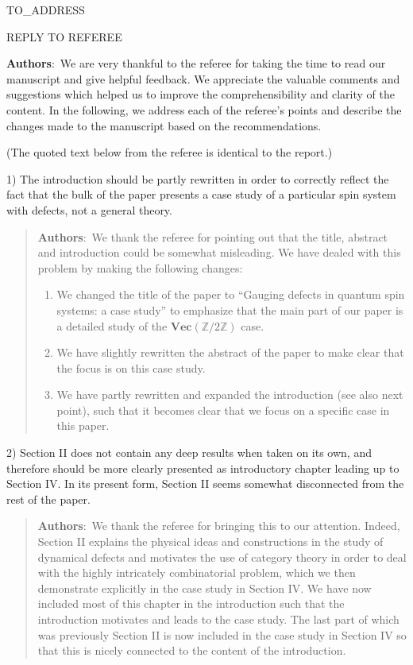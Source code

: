 \documentclass[a4paper,10pt]{letter}
\begin{document}
\begin{letter}{TO_ADDRESS}

	
\begin{center}
REPLY TO REFEREE
\end{center}

\textbf{Authors}:\ We are very thankful to the referee for taking the time to read our manuscript and give helpful feedback. We appreciate the valuable comments and suggestions which helped us to improve the comprehensibility and clarity of the content. In the following, we address each of the referee's points and describe the changes made to the manuscript based on the recommendations.

(The quoted text below from the referee is identical to the report.)
\vspace{0.5cm}

1) The introduction should be partly rewritten in order to correctly reflect the fact that the bulk of the paper presents a case study of a particular spin system with defects, not a general theory. 

\begin{quote}
	\textbf{Authors}:\ We thank the referee for pointing out that the title, abstract and introduction could be somewhat misleading. We have dealed with this problem by making the following changes:
		\begin{enumerate}
			\item We changed the title of the paper to ``Gauging defects in quantum spin systems: a case study'' to emphasize that the main part of our paper is a detailed study of the $\mathbf{Vec}(\mathbb{Z}/2\mathbb{Z})$ case.
			\item We have slightly rewritten the abstract of the paper to make clear that the focus is on this case study.
			\item We have partly rewritten and expanded the introduction (see also next point), such that it becomes clear that we focus on a specific case in this paper.
		\end{enumerate}
\end{quote}

2) Section II does not contain any deep results when taken on its own, and therefore should be more clearly presented as introductory chapter leading up to Section IV. In its present form, Section II seems somewhat disconnected from the rest of the paper.

\begin{quote}
	\textbf{Authors}:\ We thank the referee for bringing this to our attention. Indeed, Section II explains the physical ideas and constructions in the study of dynamical defects and motivates the use of category theory in order to deal with the highly intricately combinatorial problem, which we then demonstrate explicitly in the case study in Section IV. We have now included most of this chapter in the introduction such that the introduction motivates and leads to the case study. The last part of which was previously Section II is now included in the case study in Section IV so that this is nicely connected to the content of the introduction.
\end{quote}


\end{letter}
\end{document}
